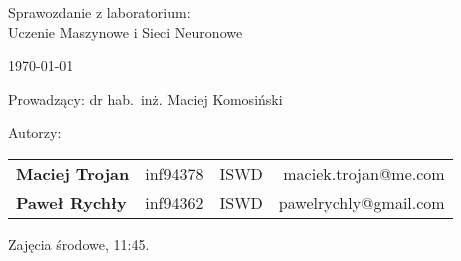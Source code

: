 \thispagestyle{empty} %

\begin{center}
{\large{Sprawozdanie z laboratorium:\\
Uczenie Maszynowe i Sieci Neuronowe}}

\vspace{3ex}


\vspace{3ex}
{\footnotesize\today}

\end{center}


\vspace{10ex}

Prowadzący: dr hab.~inż. Maciej Komosiński

\vspace{5ex}

Autorzy:
\begin{tabular}{lllr}
\textbf{Maciej Trojan} & inf94378 & ISWD & maciek.trojan@me.com \\
\textbf{Paweł Rychły } & inf94362 & ISWD & pawelrychly@gmail.com \\
\end{tabular}

\vspace{5ex}

Zajęcia środowe, 11:45.


\newpage


